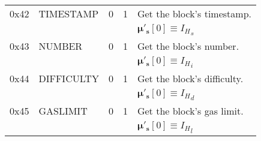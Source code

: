 \documentclass[9pt,oneside]{amsart}
\begin{document}
\begin{tabular*}{\columnwidth}[h]{rlrrl}
\midrule
0x42 & {\small TIMESTAMP} & 0 & 1 & Get the block's timestamp. \\
&&&& $\boldsymbol{\mu}'_\mathbf{s}[0] \equiv {I_H}_s$ \\
\midrule
0x43 & {\small NUMBER} & 0 & 1 & Get the block's number. \\
&&&& $\boldsymbol{\mu}'_\mathbf{s}[0] \equiv {I_H}_i$ \\
\midrule
0x44 & {\small DIFFICULTY} & 0 & 1 & Get the block's difficulty. \\
&&&& $\boldsymbol{\mu}'_\mathbf{s}[0] \equiv {I_H}_d$ \\
\midrule
0x45 & {\small GASLIMIT} & 0 & 1 & Get the block's gas limit. \\
&&&& $\boldsymbol{\mu}'_\mathbf{s}[0] \equiv {I_H}_l$ \\
\bottomrule
\end{tabular*}
\end{document}
